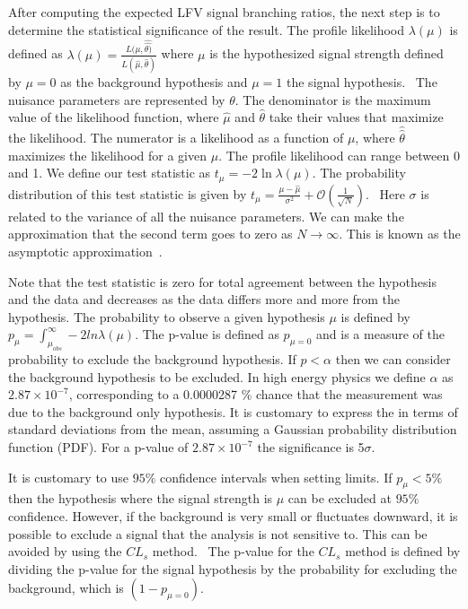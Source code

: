 \documentclass[oneside, letterpaper, oldfontcommands]{memoir}
\begin{document}
\qquad After computing the expected LFV signal branching ratios, the next step is to determine the statistical significance of the result. The profile likelihood $\lambda(\mu)$ is defined as  $\lambda(\mu) = \frac{L(\mu,\hat{\hat{\theta)}}}{L(\hat{\mu},\hat{\theta})}$ where $\mu$ is the hypothesized signal strength defined by $\mu=0$ as the background hypothesis and $\mu=1$ the signal hypothesis.~\cite{Cowan:2010js} 
The nuisance parameters are represented by $\theta$. The denominator is the maximum value of the likelihood function, where $\hat{\mu}$ and $\hat{\theta}$ take their values that maximize the likelihood. The numerator is a likelihood as a function of $\mu$, where $\hat{\hat{\theta}}$ maximizes the likelihood for a given $\mu$. The profile likelihood can range between 0 and 1. 
We define our test statistic as $t_{\mu} = -2\ln\lambda(\mu)$. The probability distribution of this test statistic is given by $t_{\mu} = \frac{\mu-\hat{\mu}}{\sigma^2} + \mathcal{O}(\frac{1}{\sqrt{N}})$.~\cite{wald1943tests} 
Here $\sigma$ is related to the variance of all the nuisance parameters. We can make the approximation that the second term goes to zero as $N \rightarrow \infty$. This is known as the asymptotic approximation~\cite{Cowan:2010js}.

\qquad Note that the test statistic is zero for total agreement between the hypothesis and the data and decreases as the data differs more and more from the hypothesis. The probability to observe a given hypothesis $\mu$ is defined by $p_{\mu} = \int_{\mu_{obs}}^{\infty} - 2 ln \lambda(\mu)$. The p-value is defined as $p_{\mu=0}$ and is a measure of the probability to exclude the background hypothesis. If $p<\alpha$ then we can consider the background hypothesis to be excluded. In high energy physics we define $\alpha$ as $2.87 \times 10^{-7}$, corresponding to a 0.0000287 \% chance that the measurement was due to the background only hypothesis. It is customary to express the in terms of standard deviations from the mean, assuming a Gaussian probability distribution function (PDF). For a p-value of $2.87 \times 10^{-7}$ the significance is 5$\sigma$. 

\qquad It is customary to use $95\%$ confidence intervals when setting limits. If $p_{\mu} < 5\%$ then the hypothesis where the signal strength is $\mu$ can be excluded at $95\%$ confidence. However, if the background is very small or fluctuates downward, it is possible to exclude a signal that the analysis is not sensitive to. This can be avoided by using the $CL_{s}$ method.~\cite{Read:451614} The p-value for the $CL_{s}$ method is defined by dividing the p-value for the signal hypothesis by the probability for excluding the background, which is $(1-p_{\mu=0})$.
\end{document}
